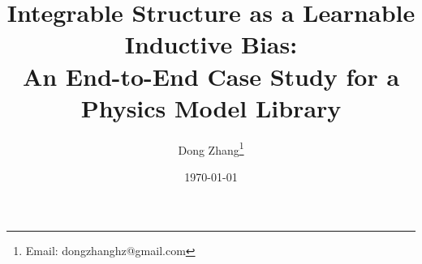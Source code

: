 \documentclass[11pt]{article}
\title{Integrable Structure as a Learnable Inductive Bias:\\
       An End-to-End Case Study for a Physics Model Library}
\author{Dong Zhang\thanks{Email: dongzhanghz@gmail.com}}
\date{\today}
\theoremstyle{definition}
\theoremstyle{plain}
\begin{document}
\maketitle

\newcommand{\amp}{\mathrm{amp}}

\end{document}
